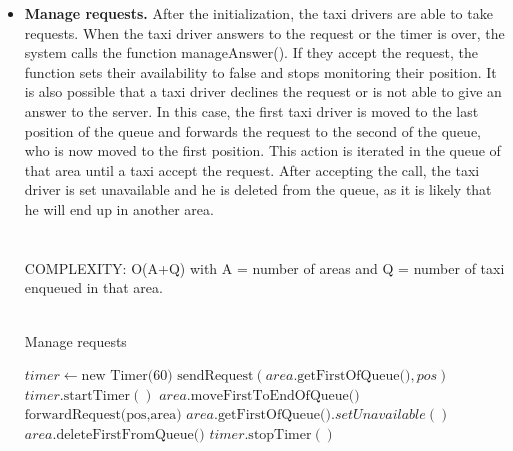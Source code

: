 \begin{itemize}
			
			\newpage
			\item \textbf{Manage requests.} After the initialization, the taxi drivers are able to take requests. When the taxi driver answers to the request or the timer is over, the system calls the function manageAnswer(). If they accept the request, the function sets their availability to false and stops monitoring their position. It is also possible that a taxi driver declines the request or is not able to give an answer to the server. In this case, the first taxi driver is moved to the last position of the queue and forwards the request to the second of the queue, who is now moved to the first position. This action is iterated in the queue of that area until a taxi accept the request. After accepting the call, the taxi driver is set unavailable and he is deleted from the queue, as it is likely that he will end up in another area.\\
			 \\\\
			COMPLEXITY: O(A+Q) with A = number of areas and Q = number of taxi enqueued in that area.\\\\
				\begin{algorithm}
					\caption{Manage requests}
					\begin{algorithmic}[1]
						\State $timer \gets \text{new Timer(60)}$
						\State $\text{sendRequest}(area.\text{getFirstOfQueue()}, pos)$
						\State $timer.\text{startTimer}()$
						\EndProcedure
							\State $area.\text{moveFirstToEndOfQueue()}$
							\State $\text{forwardRequest(pos,area)}$
						\EndIf
							\State $area.\text{getFirstOfQueue()}.setUnavailable()$
							\State $area.\text{deleteFirstFromQueue()}$
						\EndIf
						\State $timer.\text{stopTimer}()$
						\EndProcedure
					\end{algorithmic}
				\end{algorithm}
			

\end{itemize}

